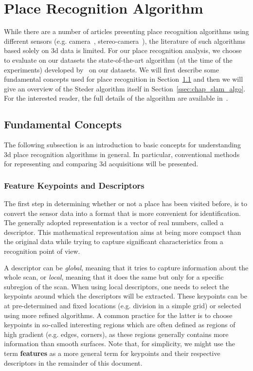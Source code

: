 \section{Place Recognition Algorithm}
\label{sec:chap_slam_algo}

While there are a number of articles presenting place recognition algorithms using different sensors (e.g. camera~\citep{Cummins2011}, stereo-camera~\citep{Cadena2012}), the literature of such algorithms based solely on \gls*{3d} data is limited. For our place recognition analysis, we choose to evaluate on our datasets the state-of-the-art algorithm (at the time of the experiments) developed by~\citet{Steder2011b} on our datasets. We will first describe some fundamental concepts used for place recognition in Section~\ref{ssec:chap_slam_basics} and then we will give an overview of the Steder algorithm itself in Section~\ref{ssec:chap_slam_algo}. For the interested reader, the full details of the algorithm are available in~\citep{Steder2011b}.


\subsection{Fundamental Concepts}
\label{ssec:chap_slam_basics}

The following subsection is an introduction to basic concepts for understanding \gls*{3d} place recognition algorithms in general. In particular, conventional methods for representing and comparing \gls*{3d} acquisitions will be presented.

\subsubsection{Feature Keypoints and Descriptors}
\label{ssub:feature_keypoints_and_descriptors}

The first step in determining whether or not a place has been visited before, is to convert the sensor data into a format that is more convenient for identification. The generally adopted representation is a vector of real numbers, called a descriptor. This mathematical representation aims at being more compact than the original data while trying to capture significant characteristics from a recognition point of view.

A descriptor can be \emph{global}, meaning that it tries to capture information about the whole scan, or \emph{local}, meaning that it does the same but only for a specific subregion of the scan. When using local descriptors, one needs to select the keypoints around which the descriptors will be extracted. These keypoints can be at pre-determined and fixed locations (e.g. division in a simple grid) or selected using more refined algorithms. A common practice for the latter is to choose keypoints in so-called interesting regions which are often defined as regions of high gradient (e.g. edges, corners), as these regions generally contains more information than smooth surfaces. Note that, for simplicity, we might use the term \textbf{features} as a more general term for keypoints and their respective descriptors in the remainder of this document.


